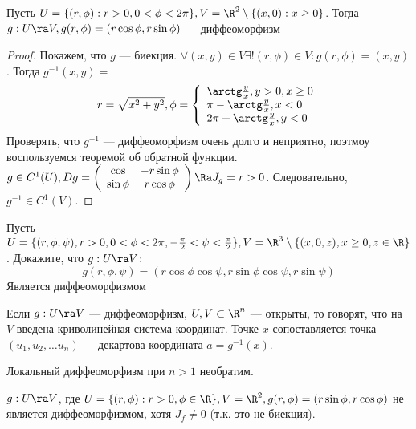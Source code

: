 \begin{example}
    Пусть \(U = \{(r, \phi): r > 0, 0 < \phi < 2\pi\}, V = \R^2 \setminus \{(x, 0): x \ge 0\}\). Тогда \(g: U \ra V, g(r, \phi) = (r\cos \phi, r\sin \phi)\) --- диффеоморфизм
\end{example}
\begin{proof}
    Покажем, что \(g\) --- биекция. \(\forall (x, y) \in V \exists ! (r, \phi) \in V: g(r, \phi) = (x, y)\). Тогда \(g^{-1}(x, y) = \)
    \[r = \sqrt{x^2 + y^2}, \phi = \left\{\begin{array}{l}
        \arctg \frac{y}{x}, y > 0, x \ge 0 \\
        \pi - \arctg \frac{y}{x}, x < 0 \\
        2\pi + \arctg \frac{y}{x}, y < 0
    \end{array}\right.\]
    Проверять, что \(g^{-1}\) --- диффеоморфизм очень долго и неприятно, поэтмоу воспользуемся теоремой об обратной функции. \(g \in C^1(U), Dg = \left( \begin{array}{cc}
        \cos & -r\sin\phi \\
        \sin \phi & r\cos \phi
    \end{array} \right) \Ra J_g = r > 0\). Следовательно, \(g^{-1} \in C^1(V)\).
\end{proof}

\begin{problem}
    Пусть \(U = \{(r, \phi, \psi), r > 0, 0 < \phi < 2\pi, -\frac{\pi}{2} < \psi < \frac{\pi}{2}\}, V = \R^3 \setminus \{(x, 0, z), x \ge 0, z \in \R\}\). Докажите, что \(g: U \ra V\):
    \[g(r, \phi, \psi) = (r\cos\phi\cos\psi, r\sin\phi\cos\psi, r\sin\psi)\]
    Является диффеоморфизмом
\end{problem}

\begin{definition}
    Если \(g: U \ra V\) --- диффеоморфизм, \(U, V \subset \R^n\) --- открыты, то говорят, что на \(V\) введена криволинейная система координат. Точке \(x\) сопоставляется точка \((u_1, u_2, \dots u_n)\) --- декартова координата \(a = g^{-1}(x)\).
\end{definition}

\begin{note}
    Локальный диффеоморфизм при \(n > 1\) необратим.
\end{note}

\begin{example}
    \(g: U \ra V\), где \(U = \{(r, \phi): r > 0, \phi \in \R\}, V = \R^2, g(r, \phi) = (r\sin\phi, r\cos\phi)\) не является диффеоморфизмом, хотя \(J_f \ne 0\) (т.к. это не биекция).
\end{example}


